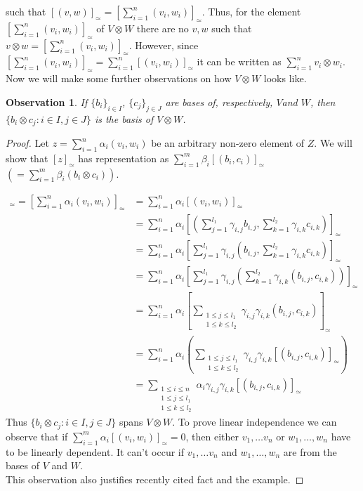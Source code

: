 \documentclass[a4paper, 12pt]{article}
\newtheorem{observation}{Observation}
\begin{document}
such that $ [(v,w)]_\simeq = \left[\displaystyle\sum^n_{i=1}(v_i,w_i)\right]_\simeq$.
Thus, for the element $\left[\displaystyle\sum^n_{i=1}(v_i,w_i)\right]_\simeq$ of $V\otimes W$
there are no $v, w$ such that $v \otimes w = \left[\displaystyle\sum^n_{i=1}(v_i,w_i)\right]_\simeq$.
However, since $\left[\displaystyle\sum^n_{i=1}(v_i,w_i)\right]_\simeq =
\displaystyle\sum^n_{i=1}[(v_i,w_i)]_\simeq$ it can be written as
$\displaystyle\sum^n_{i=1}v_i \otimes w_i$. \\
Now we will make some further observations on how $V \otimes W$ looks like.
\begin{observation}
\label{observation:1}
If $\{b_i\}_{i \in I}$, $\{c_j\}_{j \in J}$ are bases of, respectively, $V$and $W$,
then $\{b_i \otimes c_j : i \in I, j \in J\}$ is the basis of $V \otimes W$.
\end{observation}
\begin{proof}
Let $z = \displaystyle\sum^n_{i = 1}\alpha_i(v_i,w_i)$ be an arbitrary non-zero element of $Z$. We will show
that $[z]_\simeq$ has representation as $\displaystyle\sum^m_{i = 1}\beta_i [(b_i,c_i)]_\simeq$
$\left(=\displaystyle\sum^m_{i = 1}\beta_i(b_i \otimes c_i)\right)$.

\begin{align*}
[z]_\simeq = \left[\sum^n_{i = 1}\alpha_i(v_i,w_i)\right]_\simeq &=
\sum^n_{i = 1}\alpha_i[(v_i,w_i)]_\simeq \\
&= \sum^n_{i = 1}\alpha_i\left[\left(\sum^{l_1}_{j=1}\gamma_{i,j}b_{i,j},
\sum^{l_2}_{k=1}\gamma_{i,k}c_{i,k}\right)\right]_\simeq \\
&= \sum^n_{i = 1}\alpha_i\left[\sum^{l_1}_{j=1}\gamma_{i,j}\left(b_{i,j},
\sum^{l_2}_{k=1}\gamma_{i,k}c_{i,k}\right)\right]_\simeq \\
&= \sum^n_{i = 1}\alpha_i\left[\sum^{l_1}_{j=1}\gamma_{i,j}\left(\sum^{l_2}_{k=1}\gamma_{i,k}
\left(b_{i,j},c_{i,k}\right)\right)\right]_\simeq \\
&= \sum^n_{i = 1}\alpha_i\left[\sum_{\substack{1 \leq j \leq l_1 \\ 1 \leq k \leq l_2}}
\gamma_{i,j}\gamma_{i,k}(b_{i,j}, c_{i,k})\right]_\simeq \\
&= \sum^n_{i = 1}\alpha_i\left(\sum_{\substack{1 \leq j \leq l_1 \\ 1 \leq k \leq l_2}}
\gamma_{i,j}\gamma_{i,k}[(b_{i,j}, c_{i,k})]_\simeq\right) \\
&= \sum_{\substack{1 \leq i \leq n \\1 \leq j \leq l_1 \\ 1 \leq k \leq l_2}}
\alpha_i\gamma_{i,j}\gamma_{i,k}[(b_{i,j}, c_{i,k})]_\simeq
\end{align*}
Thus $\{b_i \otimes c_j : i \in I, j \in J\}$ spans $V \otimes W$. To prove linear independence we can
observe that if $\displaystyle\sum^m_{i = 1}\alpha_i [(v_i,w_i)]_\simeq = 0$,
then either $v_1, \dots v_n$ or $w_1, \dots, w_n$ have to be linearly dependent. It can't occur if
$v_1, \dots v_n$ and $w_1, \dots, w_n$ are from the bases of $V$ and $W$.\\
This observation also justifies
recently cited fact and the example.
\end{proof}
\end{document}
